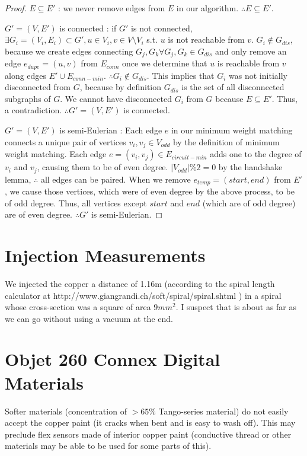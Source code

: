 \begin{proof}
$E \subseteq E'$ : we never remove edges from $E$ in our algorithm.  $\therefore E \subseteq E'$.

$G' = (V, E')$ is connected : if $G'$ is not connected, $\exists G_i = (V_i, E_i) \subset G', u \in V_i, v\in V \setminus V_i$ s.t. $u$ is not reachable from $v$.  $G_i \not\in G_{dis}$, because we create edges connecting $G_j, G_k \forall G_j, G_k \in G_{dis}$ and only remove an edge $e_{dupe} = (u, v)$ from $E_{conn}$ once we determine that $u$ is reachable from $v$ along edges $E' \cup E_{conn-min}$.  $\therefore G_i \not\in G_{dis}$.  This implies that $G_i$ was not initially disconnected from $G$, because by definition $G_{dis}$ is the set of all disconnected subgraphs of $G$.  We cannot have disconnected $G_i$ from $G$ because $E \subseteq E'$.  Thus, a contradiction.  $\therefore G' = (V, E')$ is connected.

$G' = (V, E')$ is semi-Eulerian : Each edge $e$ in our minimum weight matching connects a unique pair of vertices $v_i, v_j \in V_{odd}$ by the definition of minimum weight matching.  Each edge $e = (v_i, v_j) \in E_{circuit-min}$ adds one to the degree of $v_i$ and $v_j$, causing them to be of even degree. $|V_{odd}| \% 2 = 0$ by the handshake lemma, $\therefore$ all edges can be paired.  When we remove $e_{temp} = (start, end)$ from $E'$, we cause those vertices, which were of even degree by the above process, to be of odd degree.  Thus, all vertices except $start$ and $end$ (which are of odd degree) are of even degree.  $\therefore G'$ is semi-Eulerian.
\end{proof}

\section{Injection Measurements}
We injected the copper a distance of 1.16m (according to the spiral length calculator at http://www.giangrandi.ch/soft/spiral/spiral.shtml ) in a spiral whose cross-section was a square of area $9mm^2$.  I suspect that is about as far as we can go without using a vacuum at the end.

\section{Objet 260 Connex Digital Materials}
Softer materials (concentration of $> 65\%$ Tango-series material) do not easily accept the copper paint (it cracks when bent and is easy to wash off).  This may preclude flex sensors made of interior copper paint (conductive thread or other materials may be able to be used for some parts of this).

